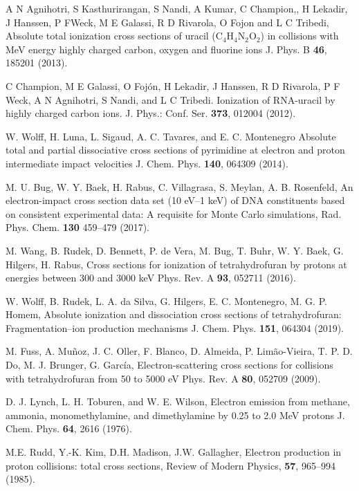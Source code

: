 \documentclass[preprint]{revtex4-2}
\begin{document}
\begin{thebibliography}{99}
A N Agnihotri, S Kasthurirangan, S Nandi, A Kumar, C Champion,, H Lekadir, 
J Hanssen, P FWeck, M E Galassi, R D Rivarola, O Fojon and L C Tribedi, 
Absolute total ionization cross sections of uracil (C$_4$H$_4$N$_2$O$_2$) in 
collisions with MeV energy highly charged carbon, oxygen and fluorine ions
J. Phys. B \textbf{46}, 185201 (2013).

C Champion, M E Galassi, O Foj\'{o}n, H Lekadir, J Hanssen, R D Rivarola,
P F Weck, A N Agnihotri, S Nandi, and L C Tribedi. 
Ionization of RNA-uracil by highly charged carbon ions.
J. Phys.: Conf. Ser. \textbf{373}, 012004 (2012).

W. Wolff, H. Luna, L. Sigaud, A. C. Tavares, and E. C. Montenegro
Absolute total and partial dissociative cross sections of pyrimidine
at electron and proton intermediate impact velocities
J. Chem. Phys. \textbf{140}, 064309 (2014).

M. U. Bug, W. Y. Baek, H. Rabus, C. Villagrasa, S. Meylan, A. B. Rosenfeld,
An electron-impact cross section data set (10 eV--1 keV) of DNA
constituents based on consistent experimental data: A requisite for 
Monte Carlo simulations,
Rad. Phys. Chem. \textbf{130} 459--479 (2017).

M. Wang, B. Rudek, D. Bennett, P. de Vera, M. Bug, T. Buhr, W. Y. Baek, 
G. Hilgers, H. Rabus, 
Cross sections for ionization of tetrahydrofuran by protons at energies 
between 300 and 3000 keV
Phys. Rev. A \textbf{93}, 052711 (2016).

W. Wolff, B. Rudek, L. A. da Silva, G. Hilgers, E. C. Montenegro, 
M. G. P. Homem,
Absolute ionization and dissociation cross sections of tetrahydrofuran:
Fragmentation--ion production mechanisms
J. Chem. Phys. \textbf{151}, 064304 (2019).

M. Fuss, A. Muñoz, J. C. Oller, F. Blanco, D. Almeida, P. Limão-Vieira, 
T. P. D. Do, M. J. Brunger, G. García,
Electron-scattering cross sections for collisions with tetrahydrofuran 
from 50 to 5000 eV
Phys. Rev. A \textbf{80}, 052709 (2009).

D. J. Lynch, L. H. Toburen, and W. E. Wilson,
Electron emission from methane, ammonia, monomethylamine, and
dimethylamine by 0.25 to 2.0 MeV protons
J. Chem. Phys. \textbf{64}, 2616 (1976).

M.E. Rudd, Y.-K. Kim, D.H. Madison, J.W. Gallagher,
Electron production in proton collisions: total cross sections,
Review of Modern Physics, \textbf{57}, 965--994 (1985).


\end{thebibliography}
\end{document}
